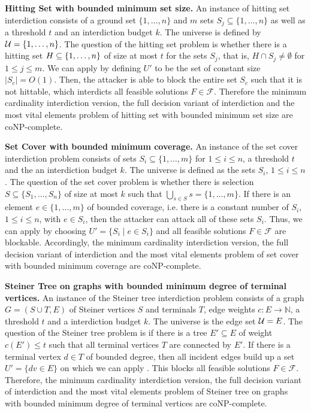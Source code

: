 \textbf{Hitting Set with bounded minimum set size.}
An instance of hitting set interdiction consists of a ground set $\{1, \ldots, n\}$ and $m$ sets $S_j \subseteq \{1,\ldots,n\}$ as well as a threshold $t$ and an interdiction budget $k$.
The universe is defined by $\mathcal{U} = \{ 1, \ldots, n \}$.
The question of the hitting set problem is whether there is a hitting set $H \subseteq \{ 1, \ldots, n \}$ of size at most $t$ for the sets $S_j$, that is, $H \cap S_j \neq \emptyset$ for $1 \leq j \leq m$.
We can apply  by defining $U'$ to be the set of constant size $|S_c| = O(1)$.
Then, the attacker is able to block the entire set $S_c$ such that it is not hittable, which interdicts all feasible solutions $F \in \mathcal F$.
Therefore the minimum cardinality interdiction version, the full decision variant of interdiction and the most vital elements problem of hitting set with bounded minimum set size are coNP-complete.

\textbf{Set Cover with bounded minimum coverage.}
An instance of the set cover interdiction problem consists of sets $S_i \subseteq \{1, \ldots, m\}$ for $1 \leq i \leq n$, a threshold $t$ and the an interdiction budget $k$.
The universe is defined as the sets $S_i$, $1 \leq i \leq n$.
The question of the set cover problem is whether there is selection $S \subseteq \{S_1, \ldots, S_n\}$ of size at most $k$ such that $\bigcup_{s \in S} s = \{1, \ldots, m\}$.
If there is an element $e \in \{1, \ldots, m\}$ of bounded coverage, i.e. there is a constant number of $S_i$, $1 \leq i \leq n$, with $e \in S_i$, then the attacker can attack all of these sets $S_i$.
Thus, we can apply  by choosing $U' = \{S_i \mid e \in S_i\}$ and all feasible solutions $F \in \mathcal F$ are blockable.
Accordingly, the minimum cardinality interdiction version, the full decision variant of interdiction and the most vital elements problem of set cover with bounded minimum coverage are coNP-complete.

\textbf{Steiner Tree on graphs with bounded minimum degree of terminal vertices.}
An instance of the Steiner tree interdiction problem consists of a graph $G= (S \cup T, E)$ of Steiner vertices $S$ and terminals $T$, edge weights $c: E \rightarrow \mathbb N$, a threshold $t$ and a interdiction budget $k$.
The universe is the edge set $\mathcal{U} = E$.
The question of the Steiner tree problem is if there is a tree $E' \subseteq E$ of weight $c(E') \leq t$ such that all terminal vertices $T$ are connected by $E'$.
If there is a terminal vertex $d \in T$ of bounded degree, then all incident edges build up a set $U' = \{dv \in E\}$ on which we can apply .
This blocks all feasible solutions $F \in \mathcal F$.
Therefore, the minimum cardinality interdiction version, the full decision variant of interdiction and the most vital elements problem of Steiner tree on graphs with bounded minimum degree of terminal vertices are coNP-complete.

